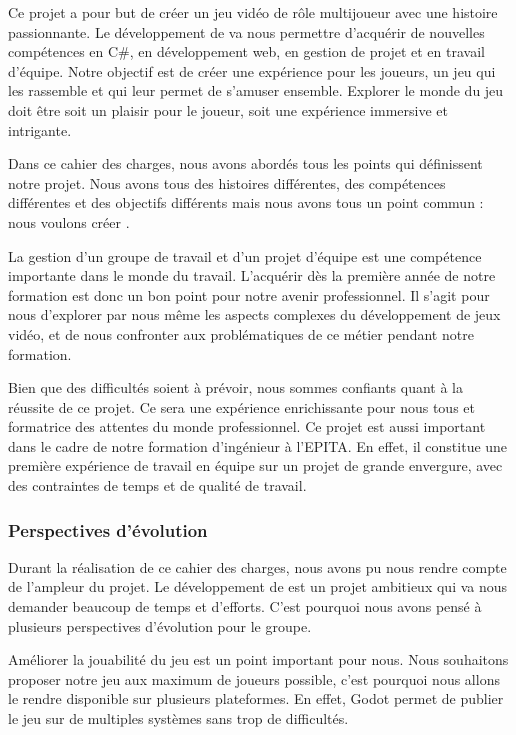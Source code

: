 Ce projet a pour but de créer un jeu vidéo de rôle multijoueur avec une histoire passionnante.
Le développement de \textit{\gameName} va nous permettre d’acquérir de nouvelles compétences en C\#, en développement web, en gestion de projet et en travail d'équipe.
Notre objectif est de créer une expérience pour les joueurs, un jeu qui les rassemble et qui leur permet de s'amuser ensemble.
Explorer le monde du jeu doit être soit un plaisir pour le joueur, soit une expérience immersive et intrigante.

Dans ce cahier des charges, nous avons abordés tous les points qui définissent notre projet.
Nous avons tous des histoires différentes, des compétences différentes et des objectifs différents mais nous avons tous un point commun : nous voulons créer \textit{\gameName}.

La gestion d'un groupe de travail et d'un projet d'équipe est une compétence importante dans le monde du travail.
L'acquérir dès la première année de notre formation est donc un bon point pour notre avenir professionnel.
Il s'agit pour nous d'explorer par nous même les aspects complexes du développement de jeux vidéo, et de nous confronter aux problématiques de ce métier pendant notre formation.

Bien que des difficultés soient à prévoir, nous sommes confiants quant à la réussite de ce projet. 
Ce sera une expérience enrichissante pour nous tous et formatrice des attentes du monde professionnel.
Ce projet est aussi important dans le cadre de notre formation d'ingénieur à l'EPITA.
En effet, il constitue une première expérience de travail en équipe sur un projet de grande envergure, avec des contraintes de temps et de qualité de travail.

\subsubsection*{Perspectives d'évolution}

Durant la réalisation de ce cahier des charges, nous avons pu nous rendre compte de l'ampleur du projet.
Le développement de \textit{\gameName} est un projet ambitieux qui va nous demander beaucoup de temps et d'efforts.
C'est pourquoi nous avons pensé à plusieurs perspectives d'évolution pour le groupe.

Améliorer la jouabilité du jeu est un point important pour nous.
Nous souhaitons proposer notre jeu aux maximum de joueurs possible, c'est pourquoi nous allons le rendre disponible sur plusieurs plateformes.
En effet, Godot permet de publier le jeu sur de multiples systèmes sans trop de difficultés.

